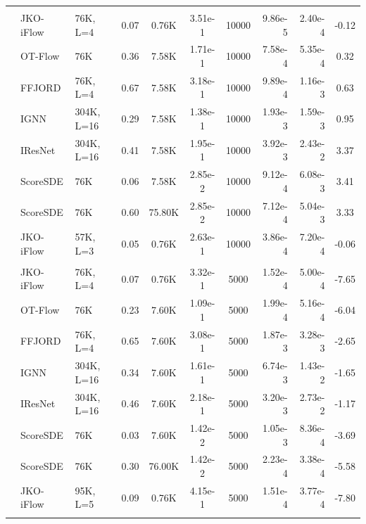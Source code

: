 \documentclass{article}
\theoremstyle{remark}
\theoremstyle{plain}
\newcommand{\JKO}{JKO-iFlow}
\begin{document}
{\begin{table}[!t]
\begin{center}
{\begin{tabular}{lllccccrrc}
    &  &  &     &   &     &     & 
     &                  \\
  &   \JKO{} &  76K, L=4 & 0.07 & 0.76K & 3.51e-1 & 10000 & 9.86e-5 & 2.40e-4 & -0.12 \\
  &  OT-Flow &  76K & 0.36 & 7.58K & 1.71e-1 & 10000 & 7.58e-4 & 5.35e-4 &  0.32 \\
  &   FFJORD &  76K, L=4  & 0.67 & 7.58K & 3.18e-1 & 10000 & 9.89e-4 & 1.16e-3 &  0.63 \\
  &     IGNN & 304K, L=16 & 0.29 & 7.58K & 1.38e-1 & 10000 & 1.93e-3 & 1.59e-3 &  0.95 \\
  &  IResNet & 304K, L=16 & 0.41 & 7.58K & 1.95e-1 & 10000 & 3.92e-3 & 2.43e-2 &  3.37 \\
  & ScoreSDE &  76K & 0.06 & 7.58K & 2.85e-2 & 10000 & 9.12e-4 & 6.08e-3 &  3.41 \\
  & ScoreSDE &  76K & 0.60 & 75.80K & 2.85e-2 & 10000 & 7.12e-4 & 5.04e-3 &  3.33 \\
  \cmidrule(lr){2-10} 
  &   \JKO{} &  57K, L=3 & 0.05 & 0.76K & 2.63e-1 & 10000 & 3.86e-4 & 7.20e-4 & -0.06 \\
    \hline
      &  &  &     &   &     &     & 
     &            \\
  &   \JKO{} &  76K, L=4 & 0.07 & 0.76K & 3.32e-1 & 5000 & 1.52e-4 & 5.00e-4 & -7.65 \\
  &  OT-Flow &  76K & 0.23 & 7.60K & 1.09e-1 & 5000 & 1.99e-4 & 5.16e-4 & -6.04 \\
  &   FFJORD &  76K, L=4 & 0.65 & 7.60K & 3.08e-1 & 5000 & 1.87e-3 & 3.28e-3 & -2.65 \\
  &     IGNN & 304K, L=16 & 0.34 & 7.60K & 1.61e-1 & 5000 & 6.74e-3 & 1.43e-2 & -1.65 \\
  &  IResNet & 304K, L=16 & 0.46 & 7.60K & 2.18e-1 & 5000 & 3.20e-3 & 2.73e-2 & -1.17 \\
  & ScoreSDE &  76K & 0.03 & 7.60K & 1.42e-2 & 5000 & 1.05e-3 & 8.36e-4 & -3.69 \\
  & ScoreSDE &  76K & 0.30 & 76.00K & 1.42e-2 & 5000 & 2.23e-4 & 3.38e-4 & -5.58 \\
  \cmidrule(lr){2-10} 
  &   \JKO{} &  95K, L=5 & 0.09 & 0.76K & 4.15e-1 & 5000 & 1.51e-4 & 3.77e-4 & -7.80 \\
    \hline
     &  &  &     &   &     &     & 

\end{tabular}}
\end{center}
\end{table}}
\end{document}
